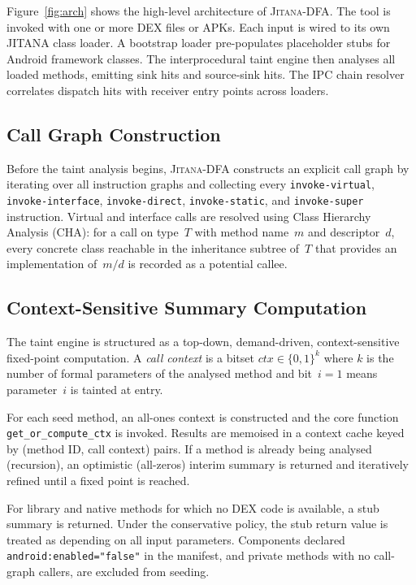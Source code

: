 \documentclass[conference]{IEEEtran}
\begin{document}
Figure~\ref{fig:arch} shows the high-level architecture of \textsc{Jitana-DFA}.
The tool is invoked with one or more DEX files or APKs. Each input is wired to
its own JITANA class loader. A bootstrap loader pre-populates placeholder stubs
for Android framework classes. The interprocedural taint engine then analyses all
loaded methods, emitting sink hits and source-sink hits. The IPC chain resolver
correlates dispatch hits with receiver entry points across loaders.

\subsection{Call Graph Construction}

Before the taint analysis begins, \textsc{Jitana-DFA} constructs an explicit
call graph by iterating over all instruction graphs and collecting every
\texttt{invoke-virtual}, \texttt{invoke-interface}, \texttt{invoke-direct},
\texttt{invoke-static}, and \texttt{invoke-super} instruction. Virtual and
interface calls are resolved using Class Hierarchy Analysis (CHA): for a call on
type~$T$ with method name~$m$ and descriptor~$d$, every concrete class reachable
in the inheritance subtree of~$T$ that provides an implementation of~$m/d$ is
recorded as a potential callee.

\subsection{Context-Sensitive Summary Computation}

The taint engine is structured as a top-down, demand-driven, context-sensitive
fixed-point computation. A \emph{call context} is a bitset $\mathit{ctx} \in
\{0,1\}^k$ where $k$ is the number of formal parameters of the analysed method
and bit~$i = 1$ means parameter~$i$ is tainted at entry.

For each seed method, an all-ones context is constructed and the core function
\texttt{get\_or\_compute\_ctx} is invoked. Results are memoised in a context
cache keyed by (method ID, call context) pairs. If a method is already being
analysed (recursion), an optimistic (all-zeros) interim summary is returned and
iteratively refined until a fixed point is reached.

For library and native methods for which no DEX code is available, a stub summary
is returned. Under the conservative policy, the stub return value is treated as
depending on all input parameters. Components declared
\texttt{android:enabled="false"} in the manifest, and private methods with no
call-graph callers, are excluded from seeding.
\end{document}
